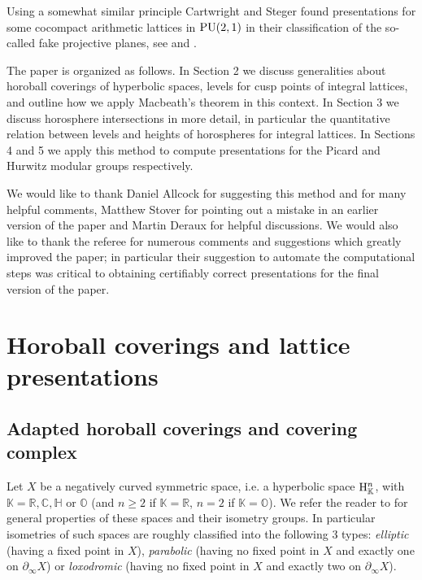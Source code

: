 \documentclass{article}[12pt]
\newcommand{\C}{\mathbb{C}}
\newcommand{\R}{\mathbb{R}}
\newcommand{\K}{\mathbb{K}}
\newcommand{\quat}{\mathbb{H}}
\newcommand{\oct}{\mathbb{O}}
\newtheorem{thm}{Theorem}%
\begin{document}
Using a somewhat similar principle Cartwright and Steger found presentations for some cocompact arithmetic lattices in ${\rm PU}(2,1)$ in their classification of the so-called fake projective planes, see \cite{CaS1} and \cite{CaS2}.

The paper is organized as follows. In Section 2 we discuss generalities about horoball coverings of hyperbolic spaces, levels for cusp points of integral lattices, and outline how we apply Macbeath's theorem in this context. In Section 3 we discuss horosphere intersections in more detail, in particular the quantitative relation between levels and heights of horospheres for integral lattices. In Sections 4 and 5 we apply this method to compute presentations for the Picard and Hurwitz modular groups respectively. 

We would like to thank Daniel Allcock for suggesting this method and for many helpful comments, Matthew Stover for pointing out a mistake in an earlier version of the paper and Martin Deraux for helpful discussions. We would also like to thank the referee for numerous comments and suggestions which greatly improved the paper; in particular their suggestion to automate the computational steps was critical to obtaining certifiably correct presentations for the final version of the paper.




\section{Horoball coverings and lattice presentations}

\subsection{Adapted horoball coverings and covering complex}\label{horoballs}

Let $X$ be a negatively curved symmetric space, i.e. 
a hyperbolic space ${\rm H}_\K^n$, with $\K=\R, \C, \quat$ or $\oct$ (and $n\geqslant 2$ if $\K=\R$, $n=2$ if $\K=\oct$). We refer the reader to \cite{CG} for general properties of these spaces and their isometry groups. In particular isometries of such spaces are roughly classified into the following 3 types: \emph{elliptic} (having a fixed point in $X$), \emph{parabolic} (having no fixed point in $X$ and exactly one on $\partial_\infty X$) or \emph{loxodromic} (having no fixed point in $X$ and exactly two on $\partial_\infty X$). 
\end{document}
